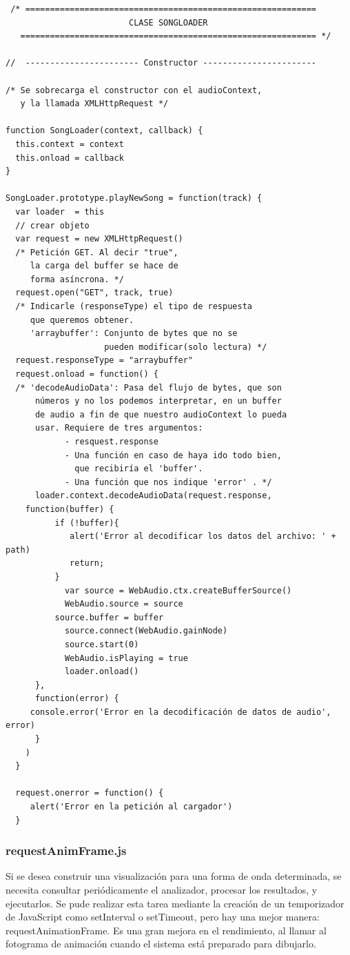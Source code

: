 \begin{verbatim}
 /* =========================================================== 
                         CLASE SONGLOADER               
   ============================================================ */

//  ----------------------- Constructor -----------------------

/* Se sobrecarga el constructor con el audioContext, 
   y la llamada XMLHttpRequest */

function SongLoader(context, callback) {
  this.context = context
  this.onload = callback
}

SongLoader.prototype.playNewSong = function(track) {
  var loader  = this
  // crear objeto 
  var request = new XMLHttpRequest()
  /* Petición GET. Al decir "true", 
     la carga del buffer se hace de 
     forma asíncrona. */
  request.open("GET", track, true)
  /* Indicarle (responseType) el tipo de respuesta 
     que queremos obtener.                              
     'arraybuffer': Conjunto de bytes que no se
                    pueden modificar(solo lectura) */
  request.responseType = "arraybuffer"
  request.onload = function() {
  /* 'decodeAudioData': Pasa del flujo de bytes, que son 
      números y no los podemos interpretar, en un buffer 
      de audio a fin de que nuestro audioContext lo pueda
      usar. Requiere de tres argumentos:
            - resquest.response            
            - Una función en caso de haya ido todo bien,
              que recibiría el 'buffer'.                               
            - Una función que nos indique 'error' . */
      loader.context.decodeAudioData(request.response,
	function(buffer) {
          if (!buffer){
             alert('Error al decodificar los datos del archivo: ' + path)
             return;
          }
			var source = WebAudio.ctx.createBufferSource()
			WebAudio.source = source
          source.buffer = buffer
			source.connect(WebAudio.gainNode)						
			source.start(0)
			WebAudio.isPlaying = true
			loader.onload()
      },
      function(error) {
	 console.error('Error en la decodificación de datos de audio', error)
      }
    )
  }

  request.onerror = function() {
     alert('Error en la petición al cargador')
  }
\end{verbatim}

\subsubsection{requestAnimFrame.js}
\label{sec:request_anim}
Si se desea construir una visualización para una forma de onda determinada, se necesita consultar periódicamente el analizador, procesar los resultados, y ejecutarlos. Se pude realizar esta tarea mediante la creación de un temporizador de JavaScript como setInterval o setTimeout, pero hay una mejor manera: requestAnimationFrame. Es una gran mejora en el rendimiento, al llamar al fotograma de animación cuando el sistema está preparado para dibujarlo.

